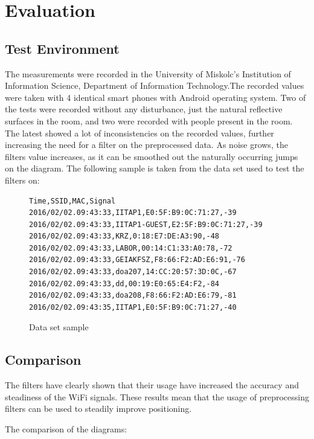 \chapter{Evaluation}
\label{chap:evaluation}
\section{Test Environment}
The measurements were recorded in the University of Miskolc's Institution of Information Science, Department of Information Technology.The recorded values were taken with 4 identical smart phones with Android operating system. Two of the tests were recorded without any disturbance, just the natural reflective surfaces in the room, and two were recorded with people present in the room. The latest showed a lot of inconsistencies on the recorded values, further increasing the need for a filter on the preprocessed data. As noise grows, the filters value increases, as it can be smoothed out the naturally occurring  jumps on the diagram.
The following sample is taken from the data set used to test the filters on:
\begin{figure}[h!]
\begin{verbatim}
Time,SSID,MAC,Signal
2016/02/02.09:43:33,IITAP1,E0:5F:B9:0C:71:27,-39
2016/02/02.09:43:33,IITAP1-GUEST,E2:5F:B9:0C:71:27,-39
2016/02/02.09:43:33,KRZ,0:18:E7:DE:A3:90,-48
2016/02/02.09:43:33,LABOR,00:14:C1:33:A0:78,-72
2016/02/02.09:43:33,GEIAKFSZ,F8:66:F2:AD:E6:91,-76
2016/02/02.09:43:33,doa207,14:CC:20:57:3D:0C,-67
2016/02/02.09:43:33,dd,00:19:E0:65:E4:F2,-84
2016/02/02.09:43:33,doa208,F8:66:F2:AD:E6:79,-81
2016/02/02.09:43:35,IITAP1,E0:5F:B9:0C:71:27,-40

\end{verbatim}
\caption{Data set sample}
\label{fig:Datasample}
\end{figure}

\section{Comparison}
The filters have clearly shown that their usage have increased the accuracy and steadiness of the WiFi signals. These results mean that the usage of preprocessing filters can be used to steadily improve positioning.



The comparison of the diagrams:


